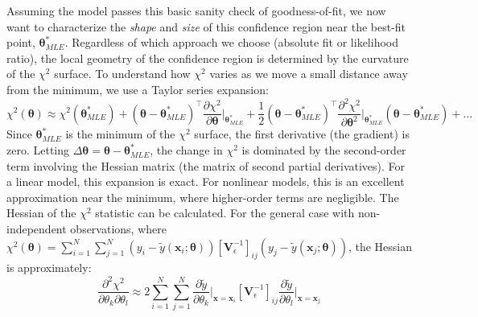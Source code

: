 Assuming the model passes this basic sanity check of goodness-of-fit, we now want to characterize the \textit{shape} and \textit{size} of this confidence region near the best-fit point, $\boldsymbol{\theta}^*_{MLE}$. Regardless of which approach we choose (absolute fit or likelihood ratio), the local geometry of the confidence region is determined by the curvature of the $\chi^2$ surface. To understand how $\chi^2$ varies as we move a small distance away from the minimum, we use a Taylor series expansion:
\begin{equation}
    \chi^2(\boldsymbol{\theta}) \approx \chi^2(\boldsymbol{\theta}^*_{MLE}) + (\boldsymbol{\theta} - \boldsymbol{\theta}^*_{MLE})^\top \frac{\partial \chi^2}{\partial \boldsymbol{\theta}} \bigg|_{\boldsymbol{\theta}^*_{MLE}} + \frac{1}{2}(\boldsymbol{\theta} - \boldsymbol{\theta}^*_{MLE})^\top \frac{\partial^2 \chi^2}{\partial \boldsymbol{\theta}^2} \bigg|_{\boldsymbol{\theta}^*_{MLE}} (\boldsymbol{\theta} - \boldsymbol{\theta}^*_{MLE}) + \dots
\end{equation}
Since $\boldsymbol{\theta}^*_{MLE}$ is the minimum of the $\chi^2$ surface, the first derivative (the gradient) is zero. Letting $\Delta\boldsymbol{\theta} = \boldsymbol{\theta} - \boldsymbol{\theta}^*_{MLE}$, the change in $\chi^2$ is dominated by the second-order term involving the Hessian matrix (the matrix of second partial derivatives). For a linear model, this expansion is exact. For nonlinear models, this is an excellent approximation near the minimum, where higher-order terms are negligible. The Hessian of the $\chi^2$ statistic can be calculated. For the general case with non-independent observations, where $\chi^2(\boldsymbol{\theta}) = \sum_{i=1}^N \sum_{j=1}^N (y_i - \tilde{y}(\mathbf{x}_i; \boldsymbol{\theta}))[\mathbf{V}_\epsilon^{-1}]_{ij}(y_j - \tilde{y}(\mathbf{x}_j; \boldsymbol{\theta}))$, the Hessian is approximately:
\begin{equation}
    \frac{\partial^2 \chi^2}{\partial \theta_k \partial \theta_l} \approx 2 \sum_{i=1}^N \sum_{j=1}^N \frac{\partial \tilde{y}}{\partial \theta_k}\bigg|_{\mathbf{x}=\mathbf{x}_i} [\mathbf{V}_\epsilon^{-1}]_{ij} \frac{\partial \tilde{y}}{\partial \theta_l}\bigg|_{\mathbf{x}=\mathbf{x}_j}
    \label{eq:hessian-approx}
\end{equation}
